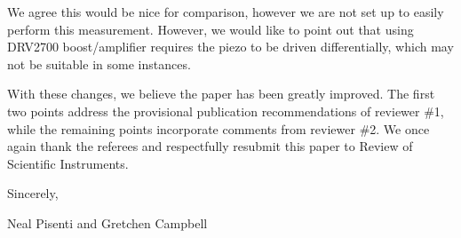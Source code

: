 \documentclass[12pt, oneside]{letter}   	%
\begin{document}
We agree this would be nice for comparison, however we are not set up to easily perform this measurement.
However, we would like to point out that using DRV2700 boost/amplifier requires the piezo to be driven differentially, which may not be suitable in some instances.

With these changes, we believe the paper has been greatly improved.
The first two points address the provisional publication recommendations of reviewer \#1, while the remaining points incorporate comments from reviewer \#2.
We once again thank the referees and respectfully resubmit this paper to Review of Scientific Instruments.

Sincerely,

Neal Pisenti and Gretchen Campbell
\end{document}
